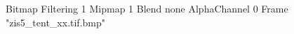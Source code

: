{Bitmap
	{Filtering 1}
	{Mipmap 1}
	{Blend none}
	{AlphaChannel 0}
	{Frame "zis5_tent_xx.tif.bmp"}
}
